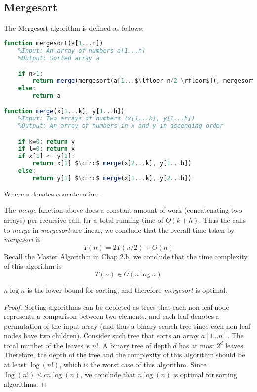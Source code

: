 \subsection{Mergesort}

\begin{definition}[Mergesort]
The Mergesort algorithm is defined as follows:
\begin{lstlisting}[mathescape=true, language=Octave]
function mergesort(a[1...n])
	%Input: An array of numbers a[1...n]
	%Output: Sorted array a

	if n>1:
		return merge(mergesort(a[1...$\lfloor n/2 \rfloor$]), mergesort(a[$\lfloor n/2 \rfloor$+1...n]))
	else:
		return a

function merge(x[1...k], y[1...h])
	%Input: Two arrays of numbers (x[1...k], y[1...h])
	%Output: An array of numbers in x and y in ascending order

	if k=0: return y
	if l=0: return x
	if x[1] <= y[1]:
		return x[1] $\circ$ merge(x[2...k], y[1...h])
	else:
		return y[1] $\circ$ merge(x[1...k], y[2...h])
\end{lstlisting}
Where $\circ$ denotes concatenation.
\end{definition}

The \textit{merge} function above does a constant amount of work (concatenating two arrays) per recursive call, for a total running time of $O(k + h)$. Thus the calls to \textit{merge} in \textit{mergesort} are linear, we conclude that the overall time taken by \textit{mergesort} is
\[
T(n) = 2T(n/2) + O(n)
\]
Recall the Master Algorithm in Chap 2.b, we conclude that the time complexity of this algorithm is
\[
T(n) \in \Theta(n\log n)
\]

\begin{remark}
$n\log n$ is the lower bound for sorting, and therefore \textit{mergesort} is optimal.

\begin{proof}
Sorting algorithms can be depicted as trees that each non-leaf node represents a comparison between two elements, and each leaf denotes a permutation of the input array (and thus a binary search tree since each non-leaf nodes have two children). Consider such tree that sorts an array $a[1...n]$. The total number of the leaves is $n!$. A binary tree of depth $d$ has at most $2^d$ leaves. Therefore, the depth of the tree and the complexity of this algorithm should be at least $\log(n!)$, which is the worst case of this algorithm. Since $\log(n!)\le cn\log(n)$, we conclude that $n\log(n)$ is optimal for sorting algorithms.
\end{proof}
\end{remark}

